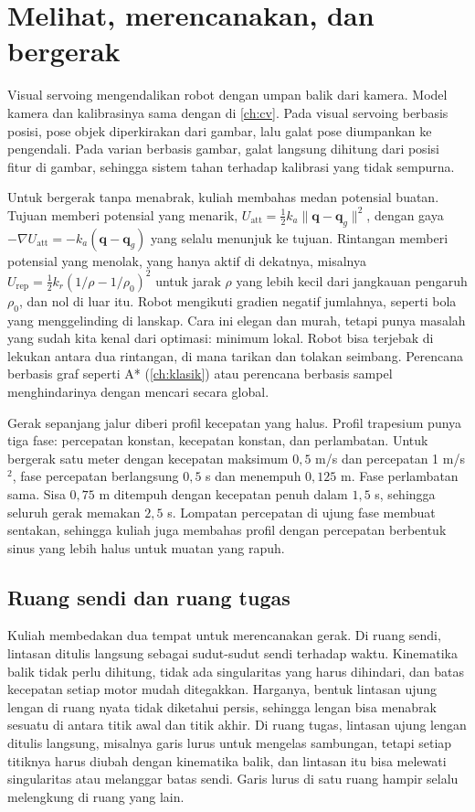 \section{Melihat, merencanakan, dan bergerak}

Visual servoing mengendalikan robot dengan umpan balik dari kamera. Model kamera dan kalibrasinya sama dengan di
\cref{ch:cv}. Pada visual servoing berbasis posisi, pose objek diperkirakan dari gambar, lalu galat pose diumpankan ke
pengendali. Pada varian berbasis gambar, galat langsung dihitung dari posisi fitur di gambar, sehingga sistem tahan
terhadap kalibrasi yang tidak sempurna.

Untuk bergerak tanpa menabrak, kuliah membahas medan potensial buatan. Tujuan memberi potensial yang menarik,
$U_{\mathrm{att}}=\tfrac12k_a\|\bm q-\bm q_g\|^2$, dengan gaya $-\nabla U_{\mathrm{att}}=-k_a(\bm q-\bm q_g)$ yang selalu
menunjuk ke tujuan. Rintangan memberi potensial yang menolak, yang hanya aktif di dekatnya, misalnya
$U_{\mathrm{rep}}=\tfrac12k_r(1/\rho-1/\rho_0)^2$ untuk jarak $\rho$ yang lebih kecil dari jangkauan pengaruh $\rho_0$, dan
nol di luar itu. Robot mengikuti gradien negatif jumlahnya, seperti bola yang menggelinding di lanskap. Cara ini
elegan dan murah, tetapi punya masalah yang sudah kita kenal dari optimasi: minimum lokal. Robot bisa terjebak di
lekukan antara dua rintangan, di mana tarikan dan tolakan seimbang. Perencana berbasis graf seperti A*
(\cref{ch:klasik}) atau perencana berbasis sampel menghindarinya dengan mencari secara global.

Gerak sepanjang jalur diberi profil kecepatan yang halus. Profil trapesium punya tiga fase: percepatan konstan,
kecepatan konstan, dan perlambatan. Untuk bergerak satu meter dengan kecepatan maksimum $0{,}5$ m/s dan percepatan
1 m/s$^2$, fase percepatan berlangsung $0{,}5$ s dan menempuh $0{,}125$ m. Fase perlambatan sama. Sisa $0{,}75$ m
ditempuh dengan kecepatan penuh dalam $1{,}5$ s, sehingga seluruh gerak memakan $2{,}5$ s. Lompatan percepatan di
ujung fase membuat sentakan, sehingga kuliah juga membahas profil dengan percepatan berbentuk sinus yang lebih halus
untuk muatan yang rapuh.

\subsection{Ruang sendi dan ruang tugas}

Kuliah membedakan dua tempat untuk merencanakan gerak. Di ruang sendi, lintasan ditulis langsung sebagai sudut-sudut sendi terhadap
waktu. Kinematika balik tidak perlu dihitung, tidak ada singularitas yang harus dihindari, dan batas kecepatan setiap motor mudah
ditegakkan. Harganya, bentuk lintasan ujung lengan di ruang nyata tidak diketahui persis, sehingga lengan bisa menabrak sesuatu di
antara titik awal dan titik akhir. Di ruang tugas, lintasan ujung lengan ditulis langsung, misalnya garis lurus untuk mengelas
sambungan, tetapi setiap titiknya harus diubah dengan kinematika balik, dan lintasan itu bisa melewati singularitas atau melanggar
batas sendi. Garis lurus di satu ruang hampir selalu melengkung di ruang yang lain.

